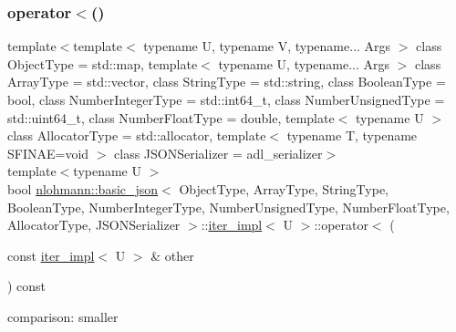 \subsubsection{\texorpdfstring{operator$<$()}{operator<()}}
{\footnotesize\ttfamily template$<$template$<$ typename U, typename V, typename... Args $>$ class Object\+Type = std\+::map, template$<$ typename U, typename... Args $>$ class Array\+Type = std\+::vector, class String\+Type  = std\+::string, class Boolean\+Type  = bool, class Number\+Integer\+Type  = std\+::int64\+\_\+t, class Number\+Unsigned\+Type  = std\+::uint64\+\_\+t, class Number\+Float\+Type  = double, template$<$ typename U $>$ class Allocator\+Type = std\+::allocator, template$<$ typename T, typename S\+F\+I\+N\+A\+E=void $>$ class J\+S\+O\+N\+Serializer = adl\+\_\+serializer$>$ \\
template$<$typename U $>$ \\
bool \mbox{\hyperlink{classnlohmann_1_1basic__json}{nlohmann\+::basic\+\_\+json}}$<$ Object\+Type, Array\+Type, String\+Type, Boolean\+Type, Number\+Integer\+Type, Number\+Unsigned\+Type, Number\+Float\+Type, Allocator\+Type, J\+S\+O\+N\+Serializer $>$\+::\mbox{\hyperlink{classnlohmann_1_1basic__json_1_1iter__impl}{iter\+\_\+impl}}$<$ U $>$\+::operator$<$ (\begin{DoxyParamCaption}\item[{const \mbox{\hyperlink{classnlohmann_1_1basic__json_1_1iter__impl}{iter\+\_\+impl}}$<$ U $>$ \&}]{other }\end{DoxyParamCaption}) const\hspace{0.3cm}{\ttfamily [inline]}}



comparison\+: smaller 

